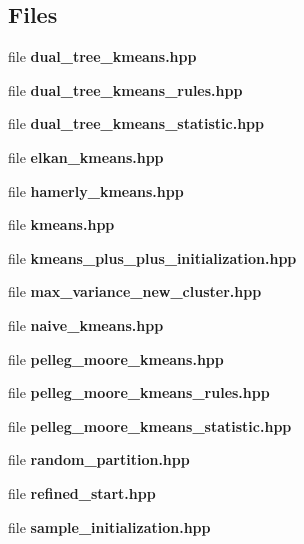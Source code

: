 \subsection*{Files}
\begin{DoxyCompactItemize}
\item 
file \textbf{ dual\+\_\+tree\+\_\+kmeans.\+hpp}
\item 
file \textbf{ dual\+\_\+tree\+\_\+kmeans\+\_\+rules.\+hpp}
\item 
file \textbf{ dual\+\_\+tree\+\_\+kmeans\+\_\+statistic.\+hpp}
\item 
file \textbf{ elkan\+\_\+kmeans.\+hpp}
\item 
file \textbf{ hamerly\+\_\+kmeans.\+hpp}
\item 
file \textbf{ kmeans.\+hpp}
\item 
file \textbf{ kmeans\+\_\+plus\+\_\+plus\+\_\+initialization.\+hpp}
\item 
file \textbf{ max\+\_\+variance\+\_\+new\+\_\+cluster.\+hpp}
\item 
file \textbf{ naive\+\_\+kmeans.\+hpp}
\item 
file \textbf{ pelleg\+\_\+moore\+\_\+kmeans.\+hpp}
\item 
file \textbf{ pelleg\+\_\+moore\+\_\+kmeans\+\_\+rules.\+hpp}
\item 
file \textbf{ pelleg\+\_\+moore\+\_\+kmeans\+\_\+statistic.\+hpp}
\item 
file \textbf{ random\+\_\+partition.\+hpp}
\item 
file \textbf{ refined\+\_\+start.\+hpp}
\item 
file \textbf{ sample\+\_\+initialization.\+hpp}
\end{DoxyCompactItemize}
